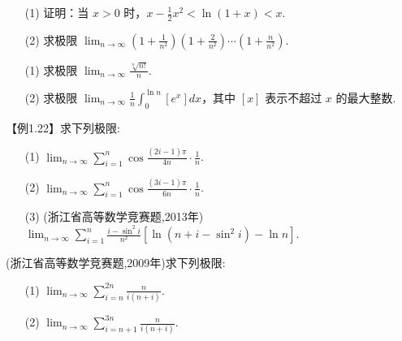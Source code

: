 \documentclass[12pt, a4paper, oneside, UTF8]{ctexbook}
\begin{document}
\begin{example}
\begin{enumerate}
    \item[(1)] 证明：当 $ x>0 $ 时，$ x-\frac{1}{2}x^{2}<\ln(1+x)<x $.
    \item[(2)] 求极限 $ \lim_{n\to\infty}(1+\frac{1}{n^{2}})(1+\frac{2}{n^{2}})\cdots(1+\frac{n}{n^{2}}) $.
\end{enumerate}
\end{example}

\begin{example}
\begin{enumerate}
    \item[(1)] 求极限 $ \lim_{n\to\infty}\frac{\sqrt[n]{n!}}{n} $.
    \item[(2)] 求极限 $ \lim_{n\to\infty}\frac{1}{n}\int_{0}^{\ln n}\left[e^{x}\right] dx $，其中 $ [x] $ 表示不超过 $ x $ 的最大整数.
\end{enumerate}
\end{example}

\begin{example}【例1.22】求下列极限:
\begin{enumerate}
    \item[(1)] $ \lim_{n\to\infty}\sum_{i=1}^{n}\cos\frac{(2i-1)\pi}{4 n}\cdot\frac{1}{n} $.
    \item[(2)] $ \lim_{n\to\infty}\sum_{i=1}^{n}\cos\frac{(3i-1)\pi}{6 n}\cdot\frac{1}{n} $.
    \item[(3)] (浙江省高等数学竞赛题,2013年) $ \lim_{n\to\infty}\sum_{i=1}^{n}\frac{i-\sin^{2}i}{n^{2}}\left[\ln\left(n+i-\sin^{2}i\right)-\ln n\right] $.
\end{enumerate}
\end{example}

\begin{example}(浙江省高等数学竞赛题,2009年)求下列极限:
\begin{enumerate}
    \item[(1)] $ \lim_{n\to\infty}\sum_{i=n}^{2 n}\frac{n}{i(n+i)} $.
    \item[(2)] $ \lim_{n\to\infty}\sum_{i=n+1}^{3n}\frac{n}{i(n+i)} $.
\end{enumerate}
\end{example}


\ifx\allfiles\undefined
\end{document}
